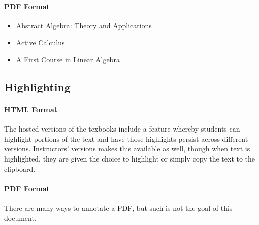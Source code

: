\documentclass[10pt,]{article}
\begin{document}
\paragraph[{PDF Format}]{PDF Format}\hypertarget{paragraphs-18}{}
\hypertarget{p-40}{}%
\leavevmode%
\begin{itemize}[label=\textbullet]
\item{}\href{}{Abstract Algebra: Theory and Applications}%
\item{}\href{}{Active Calculus}%
\item{}\href{}{A First Course in Linear Algebra}%
\end{itemize}
%
\typeout{************************************************}
\typeout{************************************************}
\subsection[{Highlighting}]{Highlighting}\label{subsection-highlighting}
\typeout{************************************************}
\typeout{************************************************}
\paragraph[{HTML Format}]{HTML Format}\hypertarget{paragraphs-19}{}
\hypertarget{p-41}{}%
The hosted versions of the texbooks include a feature whereby students can highlight portions of the text and have those highlights persist across different versions. Instructors' versions makes this available as well, though when text is highlighted, they are given the choice to highlight or simply copy the text to the clipboard.%
\typeout{************************************************}
\typeout{************************************************}
\paragraph[{PDF Format}]{PDF Format}\hypertarget{paragraphs-20}{}
\hypertarget{p-42}{}%
There are many ways to annotate a PDF, but such is not the goal of this document.%
\typeout{************************************************}
\typeout{************************************************}
\end{document}
